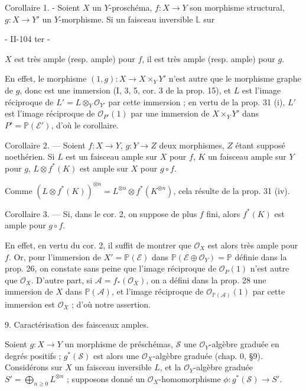 Corollaire 1. - Soient $X$ un $Y$-proschéma, $f : X \to Y$ son morphisme structural, $g : X \to Y'$ un $Y$-morphisme. Si un faisceau inversible $\mathbb{L}$ sur

\newpage


- II-104 ter -

$X$ est très ample (resp. ample) pour $f$, il est très ample (resp. ample) pour $g$.

En effet, le morphisme $(1,g) : X \to X \times_Y Y'$ n'est autre que le morphisme graphe de $g$, donc est une immersion (I, 3, 5, cor. 3 de la prop. 15), et $L$ est l'image réciproque de $L' = L \otimes_Y \mathcal{O}_{Y'}$ par cette immersion ; en vertu de la prop. 31 (i), $L'$ est l'image réciproque de $\mathcal{O}_{P'}(1)$ par une immersion de $X \times_Y Y'$ dans $P' = \mathbb{P}(\mathcal{E}')$, d'où le corollaire.

Corollaire 2. — Soient $f : X \to Y$, $g : Y \to Z$ deux morphismes, $Z$ étant supposé noethérien. Si $L$ est un faisceau ample sur $X$ pour $f$, $K$ un faisceau ample sur $Y$ pour $g$, $L \otimes f^*(K)$ est ample sur $X$ pour $g \circ f$.

Comme $(L \otimes f^*(K))^{\otimes n} = L^{\otimes n} \otimes f^*(K^{\otimes n})$, cela résulte de la prop. 31 (iv).

Corollaire 3. — Si, dans le cor. 2, on suppose de plus $f$ fini, alors $f^*(K)$ est ample pour $g \circ f$.

En effet, en vertu du cor. 2, il suffit de montrer que $\mathcal{O}_X$ est alors très ample pour $f$. Or, pour l'immersion de $X' = \mathbb{P}(\mathcal{E})$ dans $\mathbb{P}(\mathcal{E} \oplus \mathcal{O}_Y) = \mathbb{P}$ définie dans la prop. 26, on constate sans peine que l'image réciproque de $\mathcal{O}_P(1)$ n'est autre que $\mathcal{O}_X$. D'autre part, si $\mathcal{A} = f_*(\mathcal{O}_X)$, on a défini dans la prop. 28 une immersion de $X$ dans $\mathbb{P}(\mathcal{A})$, et l'image réciproque de $\mathcal{O}_{\mathbb{P}(\mathcal{A})}(1)$ par cette immersion est $\mathcal{O}_X$ ; d'où notre assertion.

9. Caractérisation des faisceaux amples.

Soient $g : X \to Y$ un morphisme de préschémas, $\mathcal{S}$ une $\mathcal{O}_Y$-algèbre graduée en degrés positifs ; $g^*(\mathcal{S})$ est alors une $\mathcal{O}_X$-algèbre graduée (chap. 0, §9). Considérons sur $X$ un faisceau inversible $L$, et la $\mathcal{O}_Y$-algèbre graduée $S' = \bigoplus_{n \ge 0} L^{\otimes n}$ ; supposons donné un $\mathcal{O}_X$-homomorphisme $\phi : g^*(\mathcal{S}) \to S'$.

